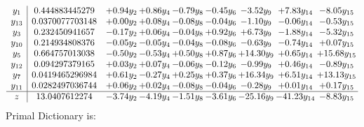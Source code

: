 \documentclass[9pt]{article}
\begin{document}
\[\begin{array}{c| c c@{\hskip 2pt} c@{\hskip 2pt} c@{\hskip 2pt} c@{\hskip 2pt} c@{\hskip 2pt} c@{\hskip 2pt} c@{\hskip 2pt} }
 y_{1}   &  0.444883445279 & +  0.94 y_{2} & +  0.86 y_{4} & -0.79 y_{8} & -0.45 y_{6} & -3.52 y_{9} & +  7.83 y_{14} & -8.05 y_{15}\\
 y_{13}   &  0.0370077703148 & +  0.00 y_{2} & +  0.08 y_{4} & -0.08 y_{8} & -0.04 y_{6} & -1.10 y_{9} & -0.06 y_{14} & -0.53 y_{15}\\
 y_{3}   &  0.232450941657 & -0.17 y_{2} & +  0.06 y_{4} & -0.04 y_{8} & +  0.92 y_{6} & +  6.73 y_{9} & -1.88 y_{14} & -5.32 y_{15}\\
 y_{10}   &  0.214934808376 & -0.05 y_{2} & -0.05 y_{4} & -0.04 y_{8} & -0.08 y_{6} & -0.63 y_{9} & -0.74 y_{14} & +  0.07 y_{15}\\
 y_{5}   &  0.664757013038 & -0.50 y_{2} & -0.53 y_{4} & +  0.50 y_{8} & +  0.87 y_{6} & + 14.30 y_{9} & +  0.65 y_{14} & + 15.68 y_{15}\\
 y_{12}   &  0.094297379165 & +  0.03 y_{2} & +  0.07 y_{4} & -0.06 y_{8} & -0.12 y_{6} & -0.99 y_{9} & +  0.46 y_{14} & -0.89 y_{15}\\
 y_{7}   &  0.0419465296984 & +  0.61 y_{2} & -0.27 y_{4} & +  0.25 y_{8} & +  0.37 y_{6} & + 16.34 y_{9} & +  6.51 y_{14} & + 13.13 y_{15}\\
 y_{11}   &  0.0282497036744 & +  0.06 y_{2} & +  0.02 y_{4} & -0.08 y_{8} & -0.04 y_{6} & -0.28 y_{9} & +  0.01 y_{14} & +  0.17 y_{15}\\
\hline
z    &  13.0407612274 & -3.74 y_{2} & -4.19 y_{4} & -1.51 y_{8} & -3.61 y_{6} & -25.16 y_{9} & -41.23 y_{14} & -8.83 y_{15}\\
\end{array}\]
Primal Dictionary is:
\end{document}
